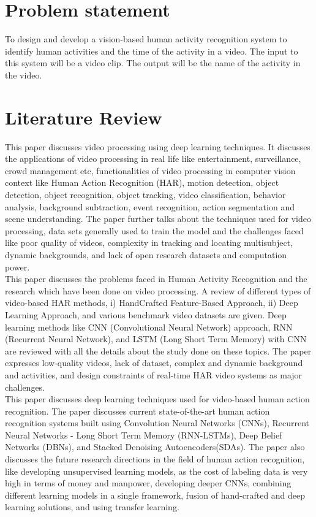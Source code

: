 \documentclass[twocolumn]{article}
\begin{document}
\section{Problem statement}
To design and develop a vision-based human activity recognition system to identify human activities and the time of the activity in a video. The input to this system will be a video clip. The output will be the name of the activity in the video.

\section{Literature Review}
\cite{b1} This paper discusses video processing using deep learning techniques. It discusses the applications of video processing in real life like entertainment, surveillance, crowd
management etc, functionalities of video processing in computer vision context like Human Action Recognition (HAR), motion detection, object detection, object recognition, object tracking,
video classification, behavior analysis, background subtraction, event recognition, action segmentation and scene understanding. The paper further talks about the techniques used for video processing,
data sets generally used to train the model and the challenges faced like poor quality of videos, complexity in tracking and locating multisubject, dynamic backgrounds, and lack of open research
datasets and computation power.\\

\cite{b2} This paper discusses the problems faced in Human Activity Recognition and the research which have been done on video processing.
A review of different types of video-based HAR methods, i) HandCrafted Feature-Based Approach, ii) Deep Learning Approach, and various benchmark video datasets are given.
Deep learning methods like CNN (Convolutional Neural Network) approach, RNN (Recurrent Neural Network), and LSTM (Long Short Term Memory) with CNN are reviewed with all the details
about the study done on these topics. The paper expresses low-quality videos, lack of dataset, complex and dynamic background and activities, and design constraints of real-time HAR video systems
as major challenges.\\

\cite{b3} This paper discusses deep learning techniques used for video-based human action recognition. The paper discusses current state-of-the-art human action recognition
systems built using Convolution Neural Networks (CNNs), Recurrent Neural Networks - Long Short Term Memory (RNN-LSTMs), Deep Belief Networks (DBNs), and Stacked Denoising Autoencoders(SDAs).
The paper also discusses the future research directions in the field of human action recognition, like developing unsupervised learning models, as the cost of labeling data is very high
in terms of money and manpower, developing deeper CNNs, combining different learning models in a single framework, fusion of hand-crafted and deep learning solutions, and using transfer learning.\\
\end{document}
